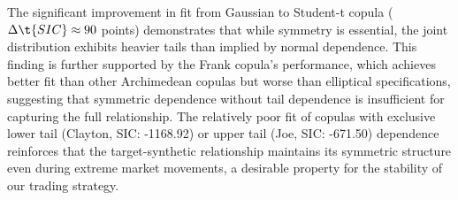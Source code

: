 The significant improvement in fit from Gaussian to Student-t copula ($\Delta \t{SIC} \approx 90$ points) demonstrates that while symmetry is essential, the joint distribution exhibits heavier tails than implied by normal dependence. This finding is further supported by the Frank copula's performance, which achieves better fit than other Archimedean copulas but worse than elliptical specifications, suggesting that symmetric dependence without tail dependence is insufficient for capturing the full relationship. The relatively poor fit of copulas with exclusive lower tail (Clayton, SIC: -1168.92) or upper tail (Joe, SIC: -671.50) dependence reinforces that the target-synthetic relationship maintains its symmetric structure even during extreme market movements, a desirable property for the stability of our trading strategy.


